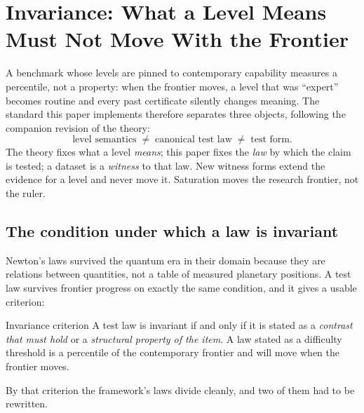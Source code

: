 \section{Invariance: What a Level Means Must Not Move With the Frontier}\label{sec:invariance}

A benchmark whose levels are pinned to contemporary capability measures a percentile, not a property: when the frontier moves, a level that was ``expert'' becomes routine and every past certificate silently changes meaning. The standard this paper implements therefore separates three objects, following the companion revision of the theory:
\[
\text{level semantics} \;\neq\; \text{canonical test law} \;\neq\; \text{test form}.
\]
The theory fixes what a level \emph{means}; this paper fixes the \emph{law} by which the claim is tested; a dataset is a \emph{witness} to that law. New witness forms extend the evidence for a level and never move it. Saturation moves the research frontier, not the ruler.

\subsection{The condition under which a law is invariant}

Newton's laws survived the quantum era in their domain because they are relations between quantities, not a table of measured planetary positions. A test law survives frontier progress on exactly the same condition, and it gives a usable criterion:

\begin{claimbox}{Invariance criterion}
A test law is invariant if and only if it is stated as a \emph{contrast that must hold} or a \emph{structural property of the item}. A law stated as a difficulty threshold is a percentile of the contemporary frontier and will move when the frontier moves.
\end{claimbox}

By that criterion the framework's laws divide cleanly, and two of them had to be rewritten.

